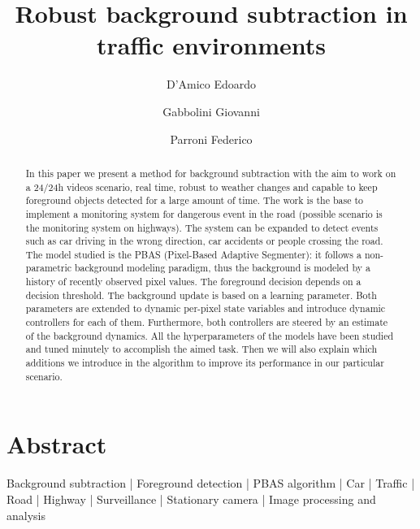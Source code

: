 
\title{Robust background subtraction in traffic environments}

\author[1 \space *]{D'Amico Edoardo}
\author[1 \space *]{Gabbolini Giovanni}
\author[1 \space *]{Parroni Federico}


\maketitle

\section*{Abstract}
\begin{abstract}
In this paper we present a method for background subtraction with the aim to work on a 24/24h videos scenario, real time, robust to weather changes and capable to keep foreground objects detected for a large amount of time. The work is the base to implement a monitoring system for dangerous event in the road (possible scenario is the monitoring system on highways). The system can be expanded to detect events such as car driving in the wrong direction, car accidents or people crossing the road.
The model studied is the PBAS (Pixel-Based Adaptive Segmenter): it follows a non-parametric background modeling paradigm, thus the background is modeled by a history of recently observed pixel values. The foreground decision depends on a decision threshold. The background update is based on a learning parameter. Both parameters are extended to dynamic per-pixel state variables and introduce dynamic controllers for each of them. Furthermore, both controllers are steered by an estimate of the background dynamics. All the hyperparameters of the models have been studied and tuned minutely to accomplish the aimed task. Then we will also explain which additions we introduce in the algorithm to improve its performance in our particular scenario.
\end {abstract}

\begin{keywords}
    Background subtraction | Foreground detection | PBAS algorithm | Car | Traffic | Road | Highway | Surveillance |
    Stationary camera | Image processing and analysis
\end{keywords}



